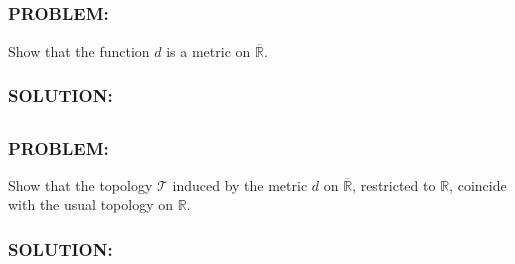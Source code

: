 \documentclass[]{article}
\newcommand{\Problem}{\subsubsection*{\textbf{PROBLEM:}}}
\newcommand{\Solution}{\subsubsection*{\textbf{SOLUTION:}}}
\newcommand{\Preliminaries}{\subsubsection*{\textbf{PRELIMINARIES:}}}
\newcommand{\R}{\mathbb{R}}
\newcommand{\st}{\ : \ }
\newtheorem{definition}{Definition}
\newtheorem{proposition}{Proposition}
\begin{document}
\subsection{}
\Problem
Show that the function $d$ is a metric on $\overline{\R}$.
\Solution


\subsection{}
\Problem
Show that the topology $\mathcal{T}$ induced by the metric $d$ on $\overline{\R}$, restricted to $\R$, coincide with the usual topology on $\R$.
\Solution





\end{document}
